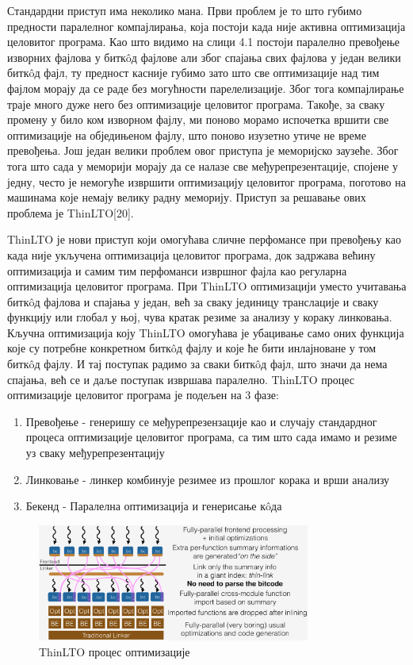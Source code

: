 \documentclass[12pt,oneside]{memoir}
\begin{document}
Стандардни приступ има неколико мана.
Први проблем је то што губимо предности паралелног компајлирања, која постоји 
када није активна оптимизација целовитог програма.
Као што видимо на слици 4.1 постоји паралелно превођење изворних фајлова у 
битк\^{o}д фајлове али због спајања свих фајлова у један велики битк\^{o}д фајл,
ту предност касније губимо зато што све оптимизације над тим фајлом морају 
да се раде без могућности парелелизације.
Због тога компајлирање траје много дуже него без оптимизације целовитог програма.
Такође, за сваку промену у било ком изворном фајлу, ми поново морамо испочетка
вршити све оптимизације на обједињеном фајлу, што поново изузетно утиче не време
превођења.
Још један велики проблем овог приступа је меморијско заузеће.
Због тога што сада у меморији морају да се налазе све међурепрезентације, спојене
у једну, често је немогуће извршити оптимизацију целовитог програма, поготово на 
машинама које немају велику радну меморију.
Приступ за решавање ових проблема је  ThinLTO[20].
\par ThinLTO је нови приступ који омогућава сличне перфомансе при превођењу
као када није укључена оптимизација целовитог програма, док задржава већину
оптимизација и самим тим перфоманси извршног фајла као регуларна оптимизација
целовитог програма.
При ThinLTO оптимизацији уместо учитавања битк\^{o}д фајлова и спајања у један,
већ за сваку јединицу транслације и сваку функцију или глобал у њој, чува кратак
резиме за анализу у кораку линковања. 
Кључна оптимизација коју ThinLTO омогућава је убацивање само оних функција које
су потребне конкретном битк\^{o}д фајлу и које ће бити инлајноване у том  битк\^{o}д фајлу.
И тај поступак радимо за сваки  битк\^{o}д фајл, што значи да нема спајања, већ се и
даље поступак  извршава паралелно.
ThinLTO процес оптимизације целовитог програма је подељен на 3 фазе:
\begin{enumerate}
\item Превођење - генеришу се међурепрезензације као и случају стандардног процеса
	оптимизације целовитог програма, са тим што сада имамо и резиме уз сваку
	међурепрезентацију
\item Линковање - линкер комбинује резимее из прошлог корака и врши анализу
\item Бекенд - Паралелна оптимизација и генерисање к\^{o}да
\end{enumerate}
 
\begin{figure}[!ht]
  \centering
  \includegraphics[width=0.8\textwidth]{LTO_thin.png}
  \caption{ThinLTO процес оптимизације}
  \label{fig:grafikon}
\end{figure}
\end{document}
